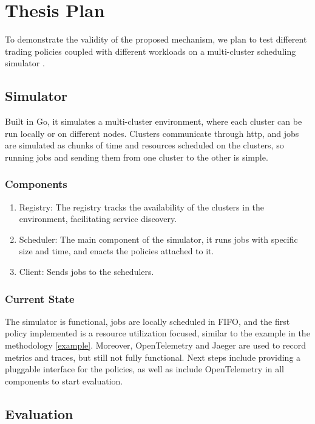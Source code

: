 \section{Thesis Plan}

To demonstrate the validity of the proposed mechanism, we plan to test different trading policies 
coupled with different workloads on a multi-cluster scheduling simulator \cite{sched-github}.

\subsection{Simulator}
Built in Go, it simulates a multi-cluster environment, where each cluster can be run locally or on different nodes. 
Clusters communicate through http, and jobs are simulated as chunks of time and resources scheduled on the clusters, 
so running jobs and sending them from one cluster to the other is simple.
\subsubsection{Components}
\begin{enumerate}
    \item Registry: The registry tracks the availability of the clusters in the environment, facilitating service discovery. 
    \item Scheduler: The main component of the simulator, it runs jobs with specific size and time, and enacts the policies 
    attached to it.
    \item Client: Sends jobs to the schedulers.
\end{enumerate}
\subsubsection{Current State}
The simulator is functional, jobs are locally scheduled in FIFO, and the first policy implemented 
is a resource utilization focused, similar to the example in the methodology \ref{example}. Moreover, 
OpenTelemetry and Jaeger are used to record metrics and traces, but still not fully functional. %
Next steps include providing a pluggable interface for the policies, as well as include OpenTelemetry 
in all components to start evaluation.

\subsection{Evaluation}
